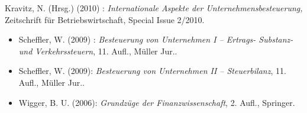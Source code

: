 \begin{course}
\begin{literature}
\begin{itemize}
Kravitz, N. (Hrsg.) (2010) : \emph{Internationale Aspekte der Unternehmensbesteuerung, }Zeitschrift für Betriebswirtschaft, Special Issue 2/2010.

   \end{itemize}\begin{itemize}\item  

Scheffler, W. (2009) : \emph{Besteuerung von Unternehmen I – Ertrags- Substanz- und Verkehrssteuern}, 11. Aufl., Müller Jur..

   \item  

Scheffler, W. (2009): \emph{Besteuerung von Unternehmen II – Steuerbilanz}, 11. Aufl., Müller Jur..

   \item  

Wigger, B. U. (2006):\emph{ Grundzüge der Finanzwissenschaft}, 2. Aufl., Springer.

   \end{itemize}\end{literature}



\end{course}